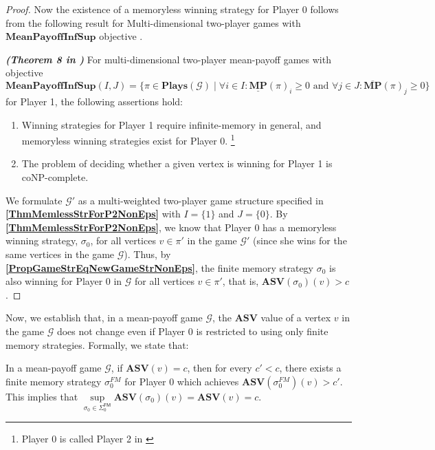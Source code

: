 \begin{proof}
Now the existence of a memoryless winning strategy for Player 0 follows from the following result for Multi-dimensional two-player games with $\mathbf{MeanPayoffInfSup}$ objective \cite{VCDHRR15}.

\begin{theorem}
\label{ThmMemlessStrForP2NonEps}
\textbf{\emph{(Theorem 8 in \cite{VCDHRR15})}} For multi-dimensional two-player mean-payoff games with objective \\
$\mathbf{MeanPayoffInfSup}(I,J) = \{\pi \in \mathbf{Plays}(\mathcal{G}) \mid \forall i \in I : \underline{\mathbf{MP}}(\pi)_i \geqslant 0 \text{ and } \forall j \in J : \overline{\mathbf{MP}}(\pi)_j \geqslant 0\}$ for Player 1, the following assertions hold:
\begin{enumerate}
    \item Winning strategies for Player 1 require infinite-memory in general, and memoryless winning strategies exist for Player 0. \footnote{Player 0 is called Player 2 in \cite{VCDHRR15}}
    \item The problem of deciding whether a given vertex is winning for Player 1 is coNP-complete.
\end{enumerate}
\end{theorem}

\noindent We formulate $\mathcal{G'}$ as a multi-weighted two-player game structure specified in \textbf{\cref{ThmMemlessStrForP2NonEps}} with $I = \{1\}$ and $J = \{0\}$. By \textbf{\cref{ThmMemlessStrForP2NonEps}}, we know that Player 0 has a memoryless winning strategy, $\sigma_0$,  for all vertices $v \in \pi'$ in the game $\mathcal{G'}$ (since she wins for the same vertices in the game $\mathcal{G}$). Thus, by \textbf{\cref{PropGameStrEqNewGameStrNonEps}}, the finite memory strategy $\sigma_0$ is also winning for Player 0 in $\mathcal{G}$ for all vertices $v \in \pi'$, that is, $\mathbf{ASV}(\sigma_0)(v) > c$.
\end{proof}

Now, we establish that, in a mean-payoff game $\mathcal{G}$, the $\mathbf{ASV}$ value of a vertex $v$ in the game $\mathcal{G}$ does not change even if Player 0 is restricted to using only finite memory strategies. Formally, we state that:

\begin{corollary}
\label{CorASVEqASVFinNonEps}
In a mean-payoff game $\mathcal{G}$, if $\mathbf{ASV}(v) = c$, then for every $c' < c$, there exists a finite memory strategy $\sigma_0^{FM}$ for Player 0 which achieves $\mathbf{ASV}(\sigma_0^{FM})(v) > c'$. This implies that $\sup\limits_{\sigma_0 \in \Sigma_0^{\mathsf{FM}}} \mathbf{ASV}(\sigma_0)(v) = \mathbf{ASV}(v) = c$.
\end{corollary}